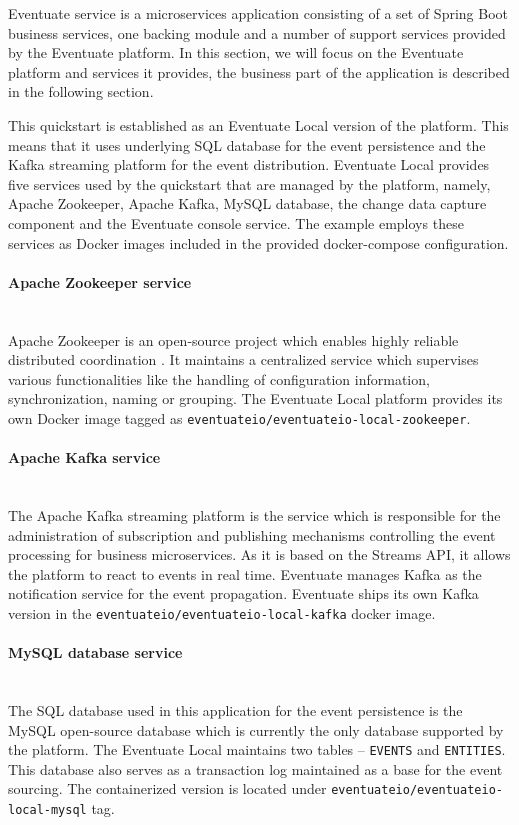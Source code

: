 \documentclass[oneside,
  digital, %
  table,   %
  lof,     %
  lot,     %
]{fithesis3}
\newcommand{\newlinepar}[1]{\paragraph{#1}\needspace{3\baselineskip}\mbox{}\\}
\begin{document}
Eventuate service is a microservices application consisting of a set of Spring Boot \cite{spring_boot} business services, one backing module and a number of support services provided by the Eventuate platform. In this section, we will focus on the Eventuate platform and services it provides, the business part of the application is described in the following section.

This quickstart is established as an Eventuate Local version of the platform. This means that it uses underlying SQL database for the event persistence and the Kafka streaming platform for the event distribution. Eventuate Local provides five services used by the quickstart that are managed by the platform, namely, Apache Zookeeper, Apache Kafka, MySQL database, the change data capture component and the Eventuate console service. The example employs these services as Docker images included in the provided docker-compose configuration.

\newlinepar{Apache Zookeeper service}

Apache Zookeeper is an open-source project which enables highly reliable distributed coordination \cite{apache_zookeeper}. It maintains a centralized service which supervises various functionalities like the handling of configuration information, synchronization, naming or grouping. The Eventuate Local platform provides its own Docker image tagged as \texttt{eventuateio/eventuateio-local-zookeeper}.

\newlinepar{Apache Kafka service}

The Apache Kafka streaming platform is the service which is responsible for the administration of subscription and publishing mechanisms controlling the event processing for business microservices. As it is based on the Streams API, it allows the platform to react to events in real time. Eventuate manages Kafka as the notification service for the event propagation. Eventuate ships its own Kafka version in the \texttt{eventuateio/eventuateio-local-kafka} docker image.

\newlinepar{MySQL database service}

The SQL database used in this application for the event persistence is the MySQL open-source database which is currently the only database supported by the platform. The Eventuate Local maintains two tables -- \texttt{EVENTS} and \texttt{ENTITIES}. This database also serves as a transaction log maintained as a base for the event sourcing. The containerized version is located under \texttt{eventuateio/eventuateio-local-mysql} tag.
\end{document}
